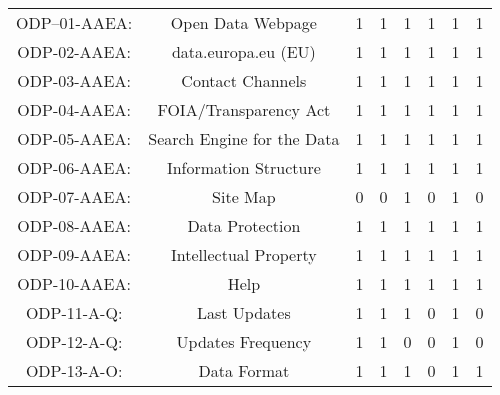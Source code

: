 \documentclass[a4paper, twoside]{report}
\begin{document}
\begin{table}[htbp]
\begin{adjustbox}{max width=\linewidth}
\begin{tabular}{rccccccc}
    \midrule
    \multicolumn{1}{c}{ODP--01-AAEA:} & \multicolumn{1}{p{19em}}{Open Data Webpage} & 1     & 1     & 1     & 1     & 1     & 1 \\
    \multicolumn{1}{c}{ODP-02-AAEA:} & \multicolumn{1}{p{19em}}{data.europa.eu (EU)} & 1     & 1     & 1     & 1     & 1     & 1 \\
    \multicolumn{1}{c}{ODP-03-AAEA:} & \multicolumn{1}{p{19em}}{Contact Channels} & 1     & 1     & 1     & 1     & 1     & 1 \\
    \multicolumn{1}{c}{ODP-04-AAEA:} & \multicolumn{1}{p{19em}}{FOIA/Transparency Act} & 1     & 1     & 1     & 1     & 1     & 1 \\
    \multicolumn{1}{c}{ODP-05-AAEA:} & \multicolumn{1}{p{19em}}{Search Engine for the Data} & 1     & 1     & 1     & 1     & 1     & 1 \\
    \multicolumn{1}{c}{ODP-06-AAEA:} & \multicolumn{1}{p{19em}}{Information Structure} & 1     & 1     & 1     & 1     & 1     & 1 \\
    \multicolumn{1}{c}{ODP-07-AAEA:} & \multicolumn{1}{p{19em}}{Site Map} & 0     & 0     & 1     & 0     & 1     & 0 \\
    \multicolumn{1}{c}{ODP-08-AAEA:} & \multicolumn{1}{p{19em}}{Data Protection} & 1     & 1     & 1     & 1     & 1     & 1 \\
    \multicolumn{1}{c}{ODP-09-AAEA:} & \multicolumn{1}{p{19em}}{Intellectual Property} & 1     & 1     & 1     & 1     & 1     & 1 \\
    \multicolumn{1}{c}{ODP-10-AAEA:} & \multicolumn{1}{p{19em}}{Help} & 1     & 1     & 1     & 1     & 1     & 1 \\
    \midrule
    \multicolumn{1}{c}{ODP-11-A-Q:} & \multicolumn{1}{p{19em}}{\cellcolor[rgb]{ .749,  .749,  .749}Last Updates} & \cellcolor[rgb]{ .749,  .749,  .749}1 & \cellcolor[rgb]{ .749,  .749,  .749}1 & \cellcolor[rgb]{ .749,  .749,  .749}1 & \cellcolor[rgb]{ .749,  .749,  .749}0 & \cellcolor[rgb]{ .749,  .749,  .749}1 & \cellcolor[rgb]{ .749,  .749,  .749}0 \\
    \multicolumn{1}{c}{ODP-12-A-Q:} & \multicolumn{1}{p{19em}}{\cellcolor[rgb]{ .749,  .749,  .749}Updates Frequency} & \cellcolor[rgb]{ .749,  .749,  .749}1 & \cellcolor[rgb]{ .749,  .749,  .749}1 & \cellcolor[rgb]{ .749,  .749,  .749}0 & \cellcolor[rgb]{ .749,  .749,  .749}0 & \cellcolor[rgb]{ .749,  .749,  .749}1 & \cellcolor[rgb]{ .749,  .749,  .749}0 \\
    \midrule
    \multicolumn{1}{c}{ODP-13-A-O:} & \multicolumn{1}{p{19em}}{Data Format} & 1     & 1     & 1     & 0     & 1     & 1 \\

\end{tabular}
\end{adjustbox}
\end{table}
\end{document}
